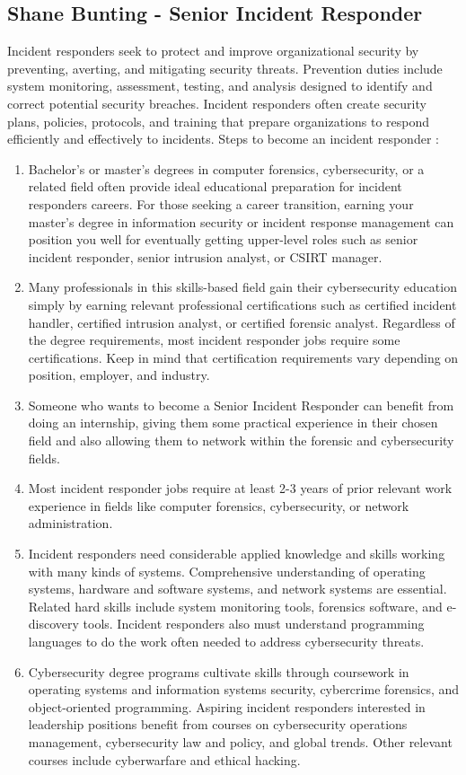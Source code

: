 \documentclass[11pt, oneside, a4paper, titlepage]{article}
\begin{document}
\subsection{Shane Bunting - Senior Incident Responder}
Incident responders seek to protect and improve organizational security by preventing, averting, and mitigating security threats. Prevention duties include system monitoring, assessment, testing, and analysis designed to identify and correct potential security breaches. Incident responders often create security plans, policies, protocols, and training that prepare organizations to respond efficiently and effectively to incidents. Steps to become an incident responder : 
\begin{enumerate}
	\item
    Bachelor's or master's degrees in computer forensics, cybersecurity, or a related field often provide ideal educational preparation for incident responders careers. For those seeking a career transition, earning your master's degree in information security or incident response management can position you well for eventually getting upper-level roles such as senior incident responder, senior intrusion analyst, or CSIRT manager. 
	\item
    Many professionals in this skills-based field gain their cybersecurity education simply by earning relevant professional certifications such as certified incident handler, certified intrusion analyst, or certified forensic analyst. Regardless of the degree requirements, most incident responder jobs require some certifications. Keep in mind that certification requirements vary depending on position, employer, and industry. 
	\item
    Someone who wants to become a Senior Incident Responder can benefit from doing an internship, giving them some practical experience in their chosen field and also allowing them to network within the forensic and cybersecurity fields. 
	\item
Most incident responder jobs require at least 2-3 years of prior relevant work experience in fields like computer forensics, cybersecurity, or network administration.
	\item
    Incident responders need considerable applied knowledge and skills working with many kinds of systems. Comprehensive understanding of operating systems, hardware and software systems, and network systems are essential. Related hard skills include system monitoring tools, forensics software, and e-discovery tools. Incident responders also must understand programming languages to do the work often needed to address cybersecurity threats. 
	\item
    Cybersecurity degree programs cultivate skills through coursework in operating systems and information systems security, cybercrime forensics, and object-oriented programming. Aspiring incident responders interested in leadership positions benefit from courses on cybersecurity operations management, cybersecurity law and policy, and global trends. Other relevant courses include cyberwarfare and ethical hacking. 
\end{enumerate}
\end{document}
